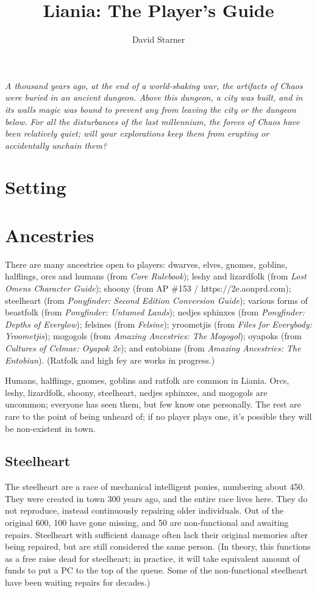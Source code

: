 \documentclass{report}
\title{Liania: The Player's Guide}
\author{David Starner}
\begin{document}
\maketitle
\emph{A thousand years ago, at the end of a world-shaking war, the artifacts of
Chaos were buried in an ancient dungeon. Above this dungeon, a city was built,
and in its walls magic was bound to prevent any from leaving the city or the
dungeon below. For all the disturbances of the last millennium, the forces
of Chaos have been relatively quiet; will your explorations keep them from
erupting or accidentally unchain them?}

\chapter{Setting}

\chapter{Ancestries}

There are many ancestries open to players: dwarves, elves, gnomes, goblins,
halflings, orcs and humans (from \emph{Core Rulebook}); leshy and lizard\-folk (from
\emph{Lost Omens Character Guide}); shoony (from AP \#153 / https://2e.aonprd.com);
steel\-heart (from \emph{Pony\-finder: Second Edition Conversion Guide}); various forms
of beast\-folk (from \emph{Pony\-finder: Untamed Lands}); nedjes sphinxes (from \emph{Pony\-finder:
Depths of Everglow}); felsines (from \emph{Felsine}); yroo\-metjis (from
\emph{Files for Everybody: Yroometjis}); mogogols (from
\emph{Amazing Ancestries: The Mogogol}); oya\-poks (from
\emph{Cultures of Celmae: Oyapok 2e}); and ento\-bians (from
\emph{Amazing Ancestries: The Entobian}). (Ratfolk and high fey are works in
progress.)

Humans, halflings, gnomes, goblins and ratfolk are common in Liania.
Orcs, leshy, lizardfolk, shoony, steelheart, nedjes sphinxes, and mogogols are
uncommon; everyone has seen them, but few know one personally. The rest are
rare to the point of being unheard of; if no player plays one, it's possible
they will be non-existent in town.

\section{Steelheart}

The steelheart are a race of mechanical intelligent ponies, numbering about 450.
They were created in town 300 years ago, and the entire race lives here. They
do not reproduce, instead continuously repairing older individuals. Out of the
original 600, 100 have gone missing, and 50 are non-functional and awaiting
repairs. Steelheart with sufficient damage often lack their original memories
after being repaired, but are still considered the same person. (In theory,
this functions as a free raise dead for steelheart; in practice, it will
take equivalent amount of funds to put a PC to the top of the queue. Some
of the non-functional steelheart have been waiting repairs for decades.)
\end{document}
